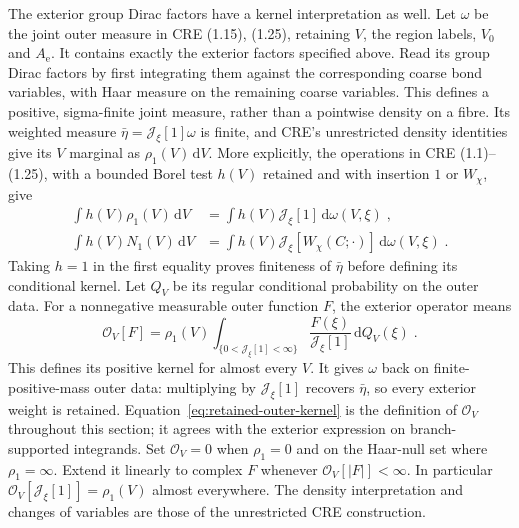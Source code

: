 \documentclass[11pt]{article}
\newcommand{\dd}{\mathrm{d}}
\begin{document}
The exterior group Dirac factors have a kernel interpretation as well. Let $\omega$ be the joint outer measure in CRE (1.15), (1.25), retaining $V$, the region labels, $V_0$ and $A_{\mathrm e}$. It contains exactly the exterior factors specified above. Read its group Dirac factors by first integrating them against the corresponding coarse bond variables, with Haar measure on the remaining coarse variables. This defines a positive, sigma-finite joint measure, rather than a pointwise density on a fibre. Its weighted measure $\bar\eta=\mathcal J_\xi[1]\omega$ is finite, and CRE's unrestricted density identities give its $V$ marginal as $\rho_1(V)\,\dd V$. More explicitly, the operations in CRE (1.1)--(1.25), with a bounded Borel test $h(V)$ retained and with insertion $1$ or $W_\chi$, give
\begin{equation}\label{eq:retained-outer-measure-identities}
    \begin{aligned}
        \int h(V)\rho_1(V)\,\dd V
            &=\int h(V)\mathcal J_\xi[1]\,\dd\omega(V,\xi)\;,\\
        \int h(V)N_1(V)\,\dd V
            &=\int h(V)\mathcal J_\xi[W_\chi(C;\cdot)]\,\dd\omega(V,\xi)\;.
    \end{aligned}
\end{equation}
Taking $h=1$ in the first equality proves finiteness of $\bar\eta$ before defining its conditional kernel. Let $Q_V$ be its regular conditional probability on the outer data. For a nonnegative measurable outer function $F$, the exterior operator means
\begin{equation}\label{eq:retained-outer-kernel}
    \mathcal O_V[F]=\rho_1(V)
        \int_{\{0<\mathcal J_\xi[1]<\infty\}}
            \frac{F(\xi)}{\mathcal J_\xi[1]}\,\dd Q_V(\xi)\;.
\end{equation}
This defines its positive kernel for almost every $V$. It gives $\omega$ back on finite-positive-mass outer data: multiplying by $\mathcal J_\xi[1]$ recovers $\bar\eta$, so every exterior weight is retained. Equation~\eqref{eq:retained-outer-kernel} is the definition of $\mathcal O_V$ throughout this section; it agrees with the exterior expression on branch-supported integrands. Set $\mathcal O_V=0$ when $\rho_1=0$ and on the Haar-null set where $\rho_1=\infty$. Extend it linearly to complex $F$ whenever $\mathcal O_V[|F|]<\infty$. In particular $\mathcal O_V[\mathcal J_\xi[1]]=\rho_1(V)$ almost everywhere. The density interpretation and changes of variables are those of the unrestricted CRE construction.
\end{document}
